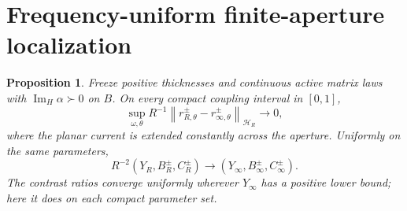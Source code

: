 \documentclass[11pt]{article}
\newtheorem{proposition}{Proposition}
\newcommand{\ImH}{\operatorname{Im}_{H}}
\newcommand{\norm}[1]{\left\lVert#1\right\rVert}
\begin{document}
\section{Frequency-uniform finite-aperture localization}
\begin{proposition}\label{prop:aperture}
Freeze positive thicknesses and continuous active matrix laws with
$\ImH\alpha\succ0$ on $B$. On every compact coupling interval in $[0,1]$,
\[
 \sup_{\omega,\theta}
 R^{-1}\norm{r_{R,\theta}^\pm-r_{\infty,\theta}^\pm}_{\mathcal H_R}
 \longrightarrow0,
\]
where the planar current is extended constantly across the aperture. Uniformly
on the same parameters,
\[
 R^{-2}(Y_R,B_R^\pm,C_R^\pm)
 \longrightarrow(Y_\infty,B_\infty^\pm,C_\infty^\pm).
\]
The contrast ratios converge uniformly wherever $Y_\infty$ has a positive
lower bound; here it does on each compact parameter set.
\end{proposition}
\end{document}
